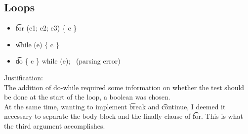 \subsection{Loops}
\begin{itemize}
    \item \t{for (e1; e2; e3) \{ c \}}
    \not\to\ 
    \to\ 
    \item \t{while (e) \{ c \}}
    \not\to\ 
    \to\ 
    \item \t{do \{ c \} while (e);}
    \not\to\ (parsing error)
    \to\ 
\end{itemize}
Justification:\\
The addition of do-while required some information on whether the test should be done at the start of the loop, a boolean was chosen.\\
At the same time, wanting to implement \t{break} and \t{continue}, I deemed it necessary to separate the body block and the finally clause of \t{for}. This is what the third argument accomplishes.

